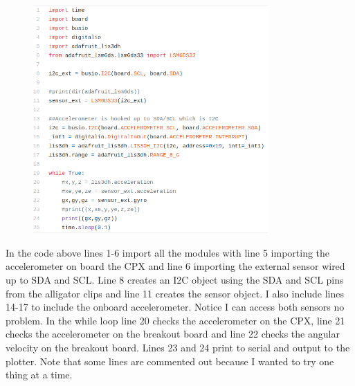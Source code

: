 \begin{figure}[H]
  \begin{center}
    \includegraphics[width=0.8\textwidth]{Figures/imu_code.png}
  \end{center}
\end{figure}
In the code above lines 1-6 import all the modules with line 5 importing the accelerometer on board the CPX and line 6 importing the external sensor wired up to SDA and SCL. Line 8 creates an I2C object using the SDA and SCL pins from the alligator clips and line 11 creates the sensor object. I also include lines 14-17 to include the onboard accelerometer. Notice I can access both sensors no problem. In the while loop line 20 checks the accelerometer on the CPX, line 21 checks the accelerometer on the breakout board and line 22 checks the angular velocity on the breakout board. Lines 23 and 24 print to serial and output to the plotter. Note that some lines are commented out because I wanted to try one thing at a time.

